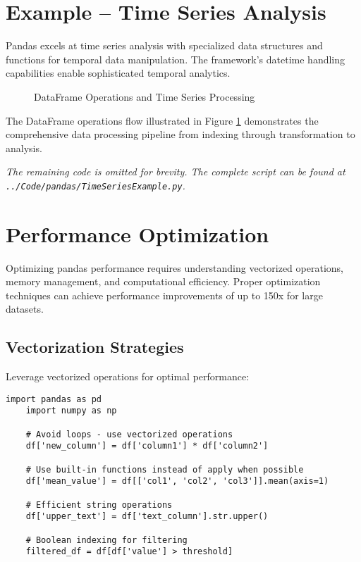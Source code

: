 \section{Example -- Time Series Analysis}
\label{sec:timeseries_example}

Pandas excels at time series analysis with specialized data structures and functions for temporal data manipulation. The framework's datetime handling capabilities enable sophisticated temporal analytics.

\begin{figure}[htbp]
	\centering
    
	\caption{DataFrame Operations and Time Series Processing}
	\label{fig:dataframe_operations}
\end{figure}

The DataFrame operations flow illustrated in Figure \ref{fig:dataframe_operations} demonstrates the comprehensive data processing pipeline from indexing through transformation to analysis.



\noindent\textit{The remaining code is omitted for brevity. The complete script can be found at \texttt{../Code/pandas/TimeSeriesExample.py}.}

\section{Performance Optimization}
\label{sec:optimization}

Optimizing pandas performance requires understanding vectorized operations, memory management, and computational efficiency. Proper optimization techniques can achieve performance improvements of up to 150x for large datasets.

\subsection{Vectorization Strategies}
\label{subsec:vectorization}

Leverage vectorized operations for optimal performance:

\begin{lstlisting}[language=MyPython, caption={Vectorization Techniques}, label={lst:vectorization}]
	import pandas as pd
	import numpy as np
	
	# Avoid loops - use vectorized operations
	df['new_column'] = df['column1'] * df['column2']
	
	# Use built-in functions instead of apply when possible
	df['mean_value'] = df[['col1', 'col2', 'col3']].mean(axis=1)
	
	# Efficient string operations
	df['upper_text'] = df['text_column'].str.upper()
	
	# Boolean indexing for filtering
	filtered_df = df[df['value'] > threshold]
\end{lstlisting}

